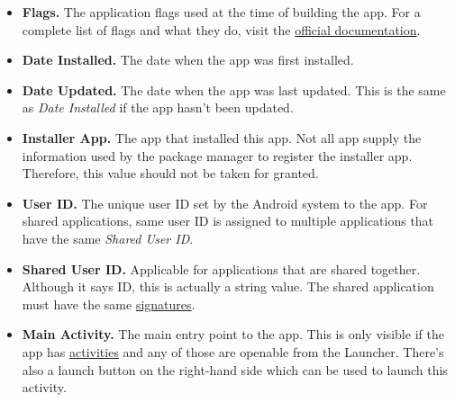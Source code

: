 \begin{itemize}
\begin{itemize}
        \item \textbf{Flags.} The application flags used at the time of building the app. For a complete list of flags
        and what they do, visit the
        \href{https://developer.android.com/reference/android/content/pm/ApplicationInfo\#flags}{official documentation}.

        \item \textbf{Date Installed.} The date when the app was first installed.

        \item \textbf{Date Updated.} The date when the app was last updated. This is the same as \textit{Date Installed}
        if the app hasn't been updated.

        \item \textbf{Installer App.} The app that installed this app. Not all app supply the information used by the
        package manager to register the installer app. Therefore, this value should not be taken for granted.

        \item \textbf{User ID.} The unique user ID set by the Android system to the app. For shared applications, same
        user ID is assigned to multiple applications that have the same \textit{Shared User ID}.

        \item \textbf{Shared User ID.} Applicable for applications that are shared together. Although it says ID, this
        is actually a string value. The shared application must have the same
        \hyperref[subsec:signatures-tab]{signatures}.

        \item \textbf{Main Activity.} The main entry point to the app. This is only visible if the app has
        \hyperref[subsubsec:activities]{activities} and any of those are openable from the Launcher. There's also a
        launch button on the right-hand side which can be used to launch this activity.
    \end{itemize}
\end{itemize}

